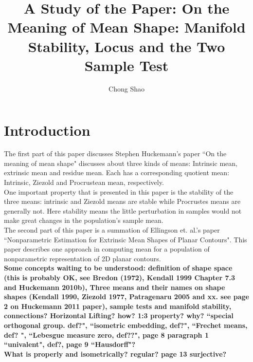 \documentclass[12pt]{article}
\theoremstyle{definition}
\theoremstyle{remark}
\numberwithin{equation}{section}
\begin{document}
\title{
A Study of the Paper: On the Meaning of Mean Shape: Manifold Stability, Locus and the Two Sample Test}%
\author{Chong Shao}%

\maketitle
\section{Introduction}
The first part of this paper discusses Stephen Huckemann's paper ``On the meaning of mean shape" discusses about three kinds of means: Intrinsic mean, extrinsic mean and residue mean. Each has a corresponding quotient mean: Intrinsic, Ziezold and Procrustean mean, respectively. \\[0.2cm]
One important property that is presented in this paper is the stability of the three means: intrinsic and Ziezold means are stable while Procrustes means are generally not. Here stability means the little perturbation in samples would not make great changes in the population's sample mean. \\[0.2cm]
The second part of this paper is a summation of Ellingson et. al.'s paper ``Nonparametric Estimation for Extrinsic Mean Shapes of Planar Contours". This paper describes one approach in computing mean for a population of nonparametric representation of 2D planar contours.\\[0.2cm]
\textbf{Some concepts waiting to be understood: definition of shape space (this is probably OK, see Bredon (1972), Kendall 1999 Chapter 7.3 and Huckemann 2010b), Three means and their names on shape shapes (Kendall 1990, Ziezold 1977, Patragenaru 2005 and xx. see page 2 on Huckemann 2011 paper), sample tests and manifold stability, connections? Horizontal Lifting? how? 1:3 property? why? ``special orthogonal group. def?", ``isometric embedding, def?", ``Frechet means, def? ", ``Lebesgue measure zero, def??", page 8 paragraph 1 ``univalent", def?, page 9 ``Hausdorff"? \\ What is properly and isometrically? regular? page 13 surjective? }
\end{document}
